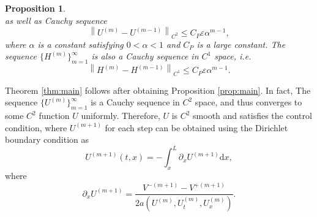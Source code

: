 \documentclass[a4paper,reqno,11pt]{amsart}
\numberwithin{equation}{section} %
\newtheorem{prop}[lem]{Proposition}
\begin{document}
\begin{prop}
\begin{equation}
\end{equation}
as well as Cauchy sequence 
\begin{equation}\label{cauchy u}
\left\lVert  U^{\left( m \right)}-U^{\left( m-1 \right)}\right\rVert  _{C^2}\leq C_P\varepsilon \alpha ^{m-1},
\end{equation}
where $\alpha$ is a constant satisfying $0<\alpha <1$ and $C_P$ is a large constant. The sequence $\{H^{(m)}\}_{m=1}^\infty$ is also a Cauchy sequence in $C^1$ space, i.e.
\begin{equation}\label{cauchy h}
\left\lVert  H^{\left( m \right)}-H^{\left( m-1 \right)}\right\rVert  _{C^1}\leq C_P\varepsilon \alpha ^{m-1}.
\end{equation}
\end{prop}
Theorem \ref{thm:main} follows after obtaining Proposition \ref{prop:main}. In fact, The sequence $\{U ^{(m)}\} _{m=1} ^ \infty $ is a Cauchy sequence in $C^2$ space, and thus converges to some $C^2$ function $ U$ uniformly. %
Therefore, $U$ is $C^2$ smooth and satisfies the control condition, where $U^{(m+1)}$ for each step can be 
obtained using the Dirichlet boundary condition as
$$
U^{(m+1)}(t,x)=-\int_x^L \partial _x U^{(m+1)} \text{d} x,
$$
where
$$
\partial _x U^{(m+1)}=\frac{V^{-\left( m+1 \right) }-V^{+\left( m+1 \right)}}{ 2a\left({U}^{\left( m \right)} ,U_{t}^{\left( m \right)},U_{x}^{\left( m \right)} \right)}.
$$
\end{document}
